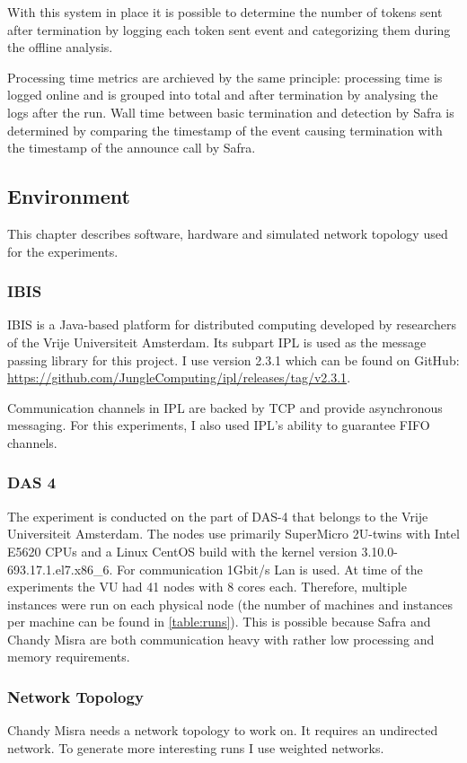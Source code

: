 With this system in place it is possible to determine the number of tokens sent after termination by logging each token sent event and categorizing them during the offline analysis.

Processing time metrics are archieved by the same principle: processing time is logged online and is grouped into total and after termination by analysing the logs after the run.
Wall time between basic termination and detection by Safra is determined by comparing the timestamp of the event causing termination with the timestamp of the announce call by Safra.

\subsection{Environment}
This chapter describes software, hardware and simulated network topology used for the experiments.
\subsubsection{IBIS}
  IBIS is a Java-based platform for distributed computing developed by researchers of the Vrije Universiteit Amsterdam. 
  Its subpart IPL is used as the message passing library for this project. 
  I use version 2.3.1 which can be found on GitHub: \href{https://github.com/JungleComputing/ipl/releases/tag/v2.3.1}{https://github.com/JungleComputing/ipl/releases/tag/v2.3.1}.
  
  Communication channels in IPL are backed by TCP and provide asynchronous messaging.
  For this experiments, I also used IPL's ability to guarantee FIFO channels.
\subsubsection{DAS 4}
  The experiment is conducted on the part of DAS-4 that belongs to the Vrije Universiteit Amsterdam. 
  The nodes use primarily SuperMicro 2U-twins with Intel E5620 CPUs and a Linux CentOS build with the kernel version 3.10.0-693.17.1.el7.x86\_6.
  For communication 1Gbit/s Lan is used.
  At time of the experiments the VU had 41 nodes with 8 cores each.
  Therefore, multiple instances were run on each physical node (the number of machines and instances per machine can be found in \cref{table:runs}).
  This is possible because Safra and Chandy Misra are both communication heavy with rather low processing and memory requirements.
 
\subsubsection{Network Topology}
  Chandy Misra needs a network topology to work on. 
  It requires an undirected network.
  To generate more interesting runs I use weighted networks.
  
